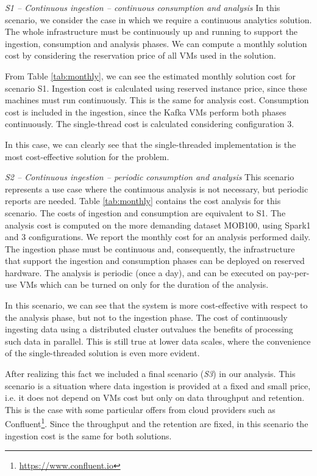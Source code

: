 {\medskip

\textit{S1 -- Continuous ingestion -- continuous consumption and analysis}
In this scenario, we consider the case in which we require a continuous analytics solution. The whole infrastructure must be continuously up and running to support the ingestion, consumption and analysis phases. We can compute a monthly solution cost by considering the reservation price of all VMs used in the solution. 

From Table \ref{tab:monthly}, we can see the estimated monthly solution cost for scenario S1. Ingestion cost is calculated using reserved instance price, since these machines must run continuously. This is the same for analysis cost. Consumption cost is included in the ingestion, since the Kafka VMs perform both phases continuously. The single-thread cost is calculated considering configuration \sti{}3. 

In this case, we can clearly see that the single-threaded implementation is the most cost-effective solution for the problem.

\medskip

\textit{S2 -- Continuous ingestion -- periodic consumption and analysis}
This scenario represents a use case where the continuous analysis is not necessary, but periodic reports are needed. Table \ref{tab:monthly} contains the cost analysis for this scenario. The costs of ingestion and consumption are equivalent to S1. The analysis cost is computed on the more demanding dataset MOB100, using Spark1 and \sti{}3 configurations. We report the monthly cost for an analysis performed daily. The ingestion phase must be continuous and, consequently, the infrastructure that support the ingestion and consumption phases can be deployed on reserved hardware. The analysis is periodic (once a day), and can be executed on pay-per-use VMs which can be turned on only for the duration of the analysis. 

In this scenario, we can see that the \sparkdi{} system is more cost-effective with respect to the analysis phase, but not to the ingestion phase. The cost of continuously ingesting data using a distributed cluster outvalues the benefits of processing such data in parallel. This is still true at lower data scales, where the convenience of the single-threaded solution is even more evident.

After realizing this fact we included a final scenario (\textit{S3}) in our analysis. This scenario is a situation where data ingestion is provided at a fixed and small price, i.e. it does not depend on VMs cost but only on data throughput and retention. This is the case with some particular offers from cloud providers such as Confluent\footnote{\url{https://www.confluent.io}}. Since the throughput and the retention are fixed, in this scenario the ingestion cost is the same for both solutions.

}
